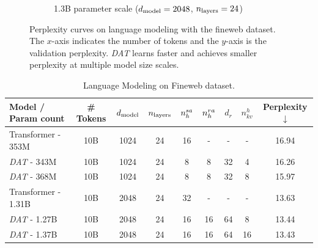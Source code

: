 \documentclass[letterpaper]{article}
\begin{document}
\begin{figure}[ht]
\begin{subfigure}{0.44\textwidth}
        \caption{1.3B parameter scale ($d_{\mathrm{model}} = 2048$, $n_{\mathrm{layers}} = 24$)}
    \end{subfigure}
    \caption{Perplexity curves on language modeling with the fineweb dataset. The $x$-axis indicates the number of tokens and the $y$-axis is the validation perplexity. \textit{DAT} learns faster and achieves smaller perplexity at multiple model size scales.}\label{fig:tiny_stories_val_loss_curves}
\end{figure}

\begin{table}[]
    \centering
    \caption{Language Modeling on Fineweb dataset.}\label{tab:my-table}
    \begin{tabular}{@{}l|c|cccccc|c@{}}
    \toprule
    Model / Param count   & \# Tokens &$d_{\mathrm{model}}$&$n_{\mathrm{layers}}$& $n_h^{sa}$  & $n_h^{ra}$ & $d_r$ & $n_{kv}^{h}$ & Perplexity $\downarrow$ \\ \midrule\hline
    Transformer - 353M    & 10B       & 1024    & 24       & 16       & -        & -     & -           & 16.94     \\
    \textit{DAT} - 343M   & 10B       & 1024    & 24       & 8        & 8        & 32    & 4           & 16.26     \\
    \textit{DAT} - 368M   & 10B       & 1024    & 24       & 8        & 8        & 32    & 8           & 15.97     \\\midrule
    Transformer - 1.31B   & 10B       & 2048    & 24       & 32       & -        & -     & -           & 13.63     \\
    \textit{DAT} - 1.27B  & 10B       & 2048    & 24       & 16       & 16       & 64    & 8           & 13.44     \\
    \textit{DAT} - 1.37B  & 10B       & 2048    & 24       & 16       & 16       & 64    & 16          & 13.43     \\ \bottomrule
    \end{tabular}%
\end{table}
\end{document}
